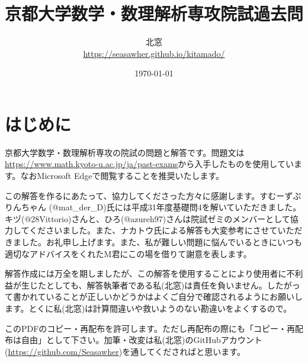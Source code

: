 \documentclass[10pt]{jsarticle}%
\begin{document}
\title{京都大学数学・数理解析専攻院試過去問}
\author{北窓 \\ \url{https://seasawher.github.io/kitamado/} }
\date{\today}
\maketitle




\tableofcontents%
\newpage



\section{はじめに}

京都大学数学・数理解析専攻の院試の問題と解答です。問題文は\url{https://www.math.kyoto-u.ac.jp/ja/past-exams}から入手したものを使用しています。なおMicrosoft Edgeで閲覧することを推奨いたします。

この解答を作るにあたって、協力してくださった方々に感謝します。すむーずぷりんちゃん (@mat\_der\_D)氏には平成31年度基礎問4を解いていただきました。キヅ(@28Vittorio)さんと、ひろ(@azureh97)さんは院試ゼミのメンバーとして協力してくださいました。また、ナカトウ氏による解答も大変参考にさせていただきました。お礼申し上げます。また、私が難しい問題に悩んでいるときにいつも適切なアドバイスをくれたM君にこの場を借りて謝意を表します。

解答作成には万全を期しましたが、この解答を使用することにより使用者に不利益が生じたとしても、解答執筆者である私(北窓)は責任を負いません。したがって書かれていることが正しいかどうかはよくご自分で確認されるようにお願いします。とくに私(北窓)は計算間違いや救いようのない勘違いをよくするので。

このPDFのコピー・再配布を許可します。ただし再配布の際にも「コピー・再配布は自由」として下さい。加筆・改変は私(北窓)のGitHubアカウント(\url{https://github.com/Seasawher})を通してくださればと思います。


\newpage





\newpage



\newpage



\newpage



\newpage


\end{document}
